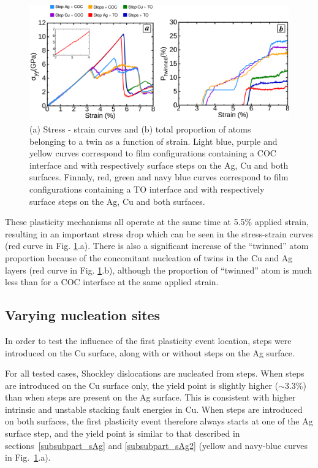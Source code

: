 \documentclass[final,3p,times,twocolumn]{elsarticle}
\begin{document}
\begin{figure}[!t]
	\begin{center}
		\includegraphics[width=150mm]{Pic/graph_natstss.eps} 
	\end{center}
	\caption{(a) Stress - strain curves and (b) total proportion of atoms belonging to a twin as a function of strain. Light blue, purple and yellow curves correspond to film configurations containing a COC interface and with respectively surface steps on the Ag, Cu and both surfaces. Finnaly, red, green and navy blue curves correspond to film configurations containing a TO interface and with respectively surface steps on the Ag, Cu and both surfaces.}\label{graph_stssnat}
\end{figure}

These plasticity mechanisms all operate at the same time at 5.5\% applied strain, resulting in an important stress drop which can be seen in the stress-strain curves (red curve in Fig. \ref{graph_stssnat}.a). There is also a significant increase of the ``twinned'' atom proportion because of the concomitant nucleation of twins in the Cu and Ag layers (red curve in Fig. \ref{graph_stssnat}.b), although the proportion of ``twinned'' atom is much less than for a COC interface at the same applied strain.
 
	\subsection{Varying nucleation sites}\label{subsubpart_comparaison}
	
In order to test the influence of the first plasticity event location, steps were introduced on the Cu surface, along with or without steps on the Ag surface.
	
For all tested cases, Shockley dislocations are nucleated from   steps. When steps are introduced on the Cu surface only, the yield point is slightly higher ($\sim 3.3\%$) than when steps are present on the Ag surface. This is consistent with higher intrinsic and unstable stacking fault energies in Cu. When steps are introduced on both surfaces, the first plasticity event therefore always starts at one of the Ag surface step, and the yield point is similar to that described in sections~\ref{subsubpart_sAg} and \ref{subsubpart_sAg2} (yellow and navy-blue curves in Fig.~\ref{graph_stssnat}.a). 
\end{document}
